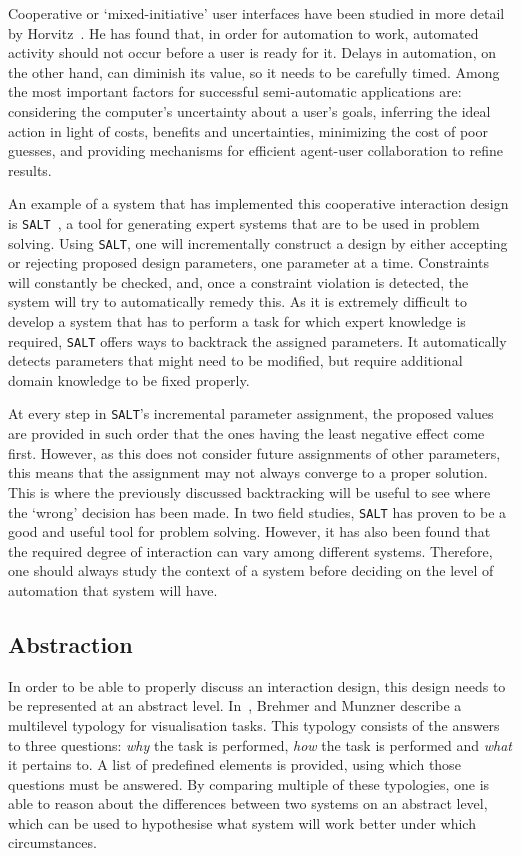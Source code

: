 Cooperative or `mixed-initiative' user interfaces have been studied in more detail by Horvitz~\cite{horvitz1999principles}. He has found that, in order for automation to work, automated activity should not occur before a user is ready for it. Delays in automation, on the other hand, can diminish its value, so it needs to be carefully timed. Among the most important factors for successful semi-automatic applications are: considering the computer's uncertainty about a user's goals, inferring the ideal action in light of costs, benefits and uncertainties, minimizing the cost of poor guesses, and providing mechanisms for efficient agent-user collaboration to refine results.

An example of a system that has implemented this cooperative interaction design is \verb|SALT|~\cite{marcus1987taking}, a tool for generating expert systems that are to be used in problem solving. Using \verb|SALT|, one will incrementally construct a design by either accepting or rejecting proposed design parameters, one parameter at a time. Constraints will constantly be checked, and, once a constraint violation is detected, the system will try to automatically remedy this. As it is extremely difficult to develop a system that has to perform a task for which expert knowledge is required, \verb|SALT| offers ways to backtrack the assigned parameters. It automatically detects parameters that might need to be modified, but require additional domain knowledge to be fixed properly.

At every step in \verb|SALT|'s incremental parameter assignment, the proposed values are provided in such order that the ones having the least negative effect come first. However, as this does not consider future assignments of other parameters, this means that the assignment may not always converge to a proper solution. This is where the previously discussed backtracking will be useful to see where the `wrong' decision has been made. In two field studies, \verb|SALT| has proven to be a good and useful tool for problem solving. However, it has also been found that the required degree of interaction can vary among different systems. Therefore, one should always study the context of a system before deciding on the level of automation that system will have.


\subsection{Abstraction}
In order to be able to properly discuss an interaction design, this design needs to be represented at an abstract level. In~\cite{brehmer2013multi}, Brehmer and Munzner describe a multilevel typology for visualisation tasks. This typology consists of the answers to three questions: \textit{why} the task is performed, \textit{how} the task is performed and \textit{what} it pertains to. A list of predefined elements is provided, using which those questions must be answered. By comparing multiple of these typologies, one is able to reason about the differences between two systems on an abstract level, which can be used to hypothesise what system will work better under which circumstances.



